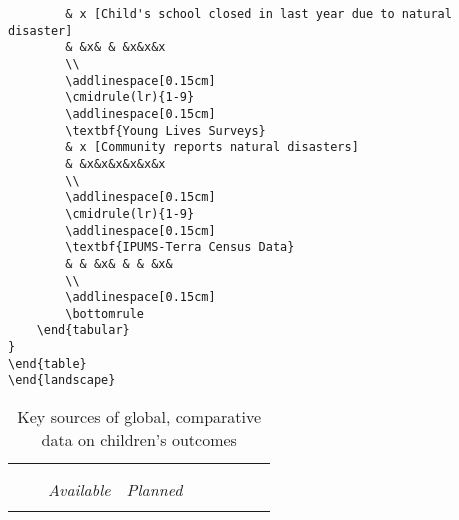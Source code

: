\documentclass[12pt,english]{article}
\begin{document}
\begin{tiny}
\begin{verbatim}
		& x [Child's school closed in last year due to natural disaster]
		& &x& & &x&x&x
		\\
		\addlinespace[0.15cm]
		\cmidrule(lr){1-9}
		\addlinespace[0.15cm]
		\textbf{Young Lives Surveys}
		& x [Community reports natural disasters]
		& &x&x&x&x&x&x
		\\
		\addlinespace[0.15cm]
		\cmidrule(lr){1-9}
		\addlinespace[0.15cm]
		\textbf{IPUMS-Terra Census Data}
		& & &x& & & &x&
		\\
		\addlinespace[0.15cm]
		\bottomrule
	\end{tabular}
}
\end{table}
\end{landscape}    
\end{verbatim}
\end{tiny}

\begin{landscape}
\begin{table}[p]
\centering{}
{\fontsize{8}{8}\selectfont
	\caption{\label{tab:paramesti}Key sources of global, comparative data on children's outcomes}
	\begin{tabular}{
	>{\centering\arraybackslash}L{2cm} >{\centering\arraybackslash}L{3.25cm} >{\centering\arraybackslash}L{1.3cm}
	>{\centering\arraybackslash}L{1.3cm}
	>{\centering\arraybackslash}L{1.7cm}
	>{\centering\arraybackslash}L{1.4cm}
	>{\centering\arraybackslash}L{2.0cm}
	>{\centering\arraybackslash}L{1.9cm}
	>{\centering\arraybackslash}L{1.3cm}
	}
		\toprule
		&
		&
		\\
		\cmidrule(lr){2-4}\cmidrule(lr){5-9}
		&
		&
		&
		&
		&
		&
		\\
		\cmidrule(lr){3-4}\cmidrule(lr){8-9}
		&
		&\emph{Available}
		&\emph{Planned}
		&
		&
		&
		&
		&\\
		\addlinespace[0.05cm]
		\\

\end{tabular}}
\end{table}
\end{landscape}
\end{document}
